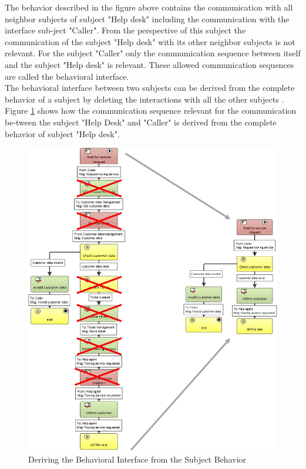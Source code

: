 The behavior described in the figure above contains the communication with all neighbor subjects of subject "Help desk" including the communication with the interface sub-ject "Caller". From the perspective of this subject the communication of the subject "Help desk" with its other neighbor subjects is not relevant. For the subject "Caller" only the commumication sequence between itself and the subject "Help desk" is relevant. These allowed communication sequences are called the behavioral interface.\\
The behavioral interface between two subjects can be derived from the complete behavior of a subject by deleting the interactions with all the other subjects . Figure \ref{fig:car-service-lev10} shows how the communication sequence relevant for the communication be-tween the subject "Help Desk" and "Caller" is derived from the complete behavior of subject "Help desk".

\begin{figure}
	\centering
	\includegraphics[width=1.0\linewidth]{Figures/Chapter5/figures-hierarchy/Car-Service-Lev10}
	\caption[Deriving the Behavioral Interface from the Subject Behavior]{Deriving the Behavioral Interface from the Subject Behavior}
	\label{fig:car-service-lev10}
\end{figure}

